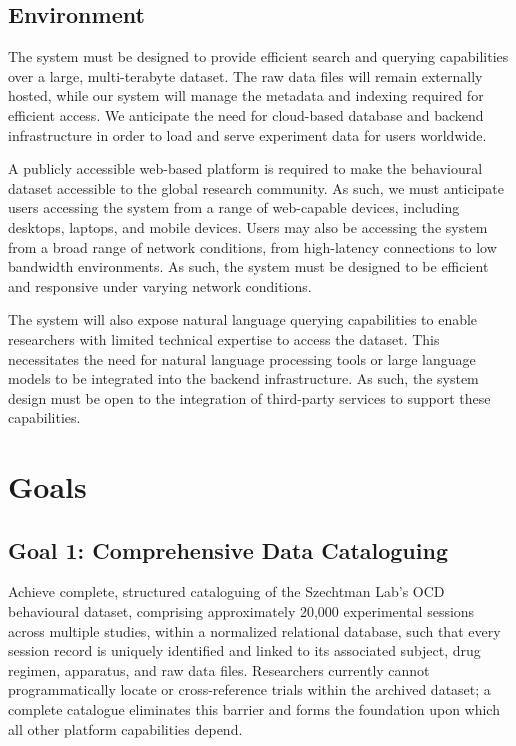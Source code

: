 \documentclass{article}
\begin{document}
\subsection{Environment}


\par{
  The system must be designed to provide efficient search and querying capabilities over a large, multi-terabyte dataset. The raw data files will remain externally hosted, while our system will manage the metadata and indexing required for efficient access. We anticipate the need for cloud-based database and backend infrastructure in order to load and serve experiment data for users worldwide.  
}

\par{
  A publicly accessible web-based platform is required to make the behavioural dataset accessible to the global research community. As such, we must anticipate users accessing the system from a range of web-capable devices, including desktops, laptops, and mobile devices. Users may also be accessing the system from a broad range of network conditions, from high-latency connections to low bandwidth environments. As such, the system must be designed to be efficient and responsive under varying network conditions. 
}

\par{
  The system will also expose natural language querying capabilities to enable researchers with limited technical expertise to access the dataset. This necessitates the need for natural language processing tools or large language models to be integrated into the backend infrastructure. As such, the system design must be open to the integration of third-party services to support these capabilities.
}


\section{Goals}

  \subsection{Goal 1: Comprehensive Data Cataloguing}
  
  \par{Achieve complete, structured cataloguing of the Szechtman Lab's OCD behavioural dataset, comprising
  approximately 20,000 experimental sessions across multiple studies, within a normalized relational database,
  such that every session record is uniquely identified and linked to its associated subject, drug regimen,
  apparatus, and raw data files. Researchers currently cannot programmatically locate or cross-reference trials
  within the archived dataset; a complete catalogue eliminates this barrier and forms the foundation upon which
  all other platform capabilities depend.}
  
\end{document}
